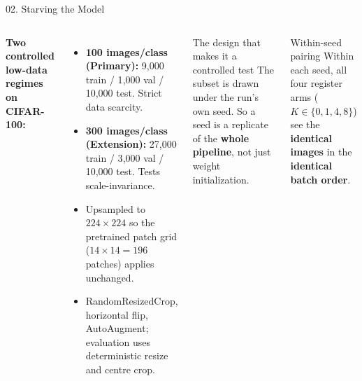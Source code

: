 \documentclass[aspectratio=169]{beamer}
\begin{document}
\begin{frame}{02. Starving the Model}
\small
\begin{columns}[T]
\textbf{Two controlled low-data regimes on CIFAR-100:}
\begin{itemize}\itemsep=3pt
\item \textbf{100 images/class (Primary):} 9{,}000 train / 1{,}000 val / 10{,}000 test. Strict data scarcity.
\item \textbf{300 images/class (Extension):} 27{,}000 train / 3{,}000 val / 10{,}000 test. Tests scale-invariance.
\item Upsampled to $224 \times 224$ so the pretrained patch grid ($14 \times 14 = 196$ patches) applies unchanged.
\item RandomResizedCrop, horizontal flip, AutoAugment; evaluation uses deterministic resize and centre crop.
\end{itemize}

\begin{block}{The design that makes it a controlled test}
The subset is drawn under the run's own seed. So a seed is a replicate of the \textbf{whole pipeline}, not just weight initialization.
\end{block}
\smallskip
\begin{block}{Within-seed pairing}
Within each seed, all four register arms ($K \in \{0, 1, 4, 8\}$) see the \textbf{identical images} in the \textbf{identical batch order}.
\end{block}
\end{columns}
\end{frame}
\end{document}
